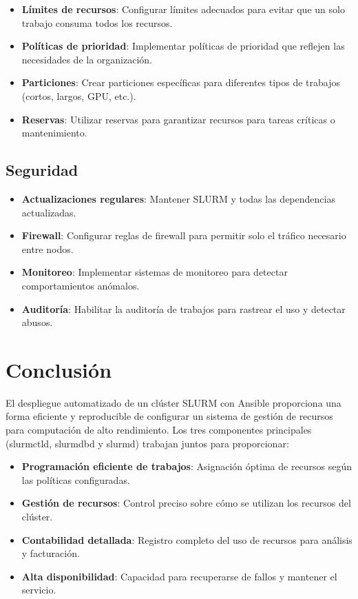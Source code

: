 \documentclass[12pt,a4paper]{article}
\begin{document}
\begin{itemize}[leftmargin=*]
    \item \textbf{Límites de recursos}: Configurar límites adecuados para evitar que un solo trabajo consuma todos los recursos.
    \item \textbf{Políticas de prioridad}: Implementar políticas de prioridad que reflejen las necesidades de la organización.
    \item \textbf{Particiones}: Crear particiones específicas para diferentes tipos de trabajos (cortos, largos, GPU, etc.).
    \item \textbf{Reservas}: Utilizar reservas para garantizar recursos para tareas críticas o mantenimiento.
\end{itemize}

\subsection{Seguridad}

\begin{itemize}[leftmargin=*]
    \item \textbf{Actualizaciones regulares}: Mantener SLURM y todas las dependencias actualizadas.
    \item \textbf{Firewall}: Configurar reglas de firewall para permitir solo el tráfico necesario entre nodos.
    \item \textbf{Monitoreo}: Implementar sistemas de monitoreo para detectar comportamientos anómalos.
    \item \textbf{Auditoría}: Habilitar la auditoría de trabajos para rastrear el uso y detectar abusos.
\end{itemize}

\section{Conclusión}

El despliegue automatizado de un clúster SLURM con Ansible proporciona una forma eficiente y reproducible de configurar un sistema de gestión de recursos para computación de alto rendimiento. Los tres componentes principales (slurmctld, slurmdbd y slurmd) trabajan juntos para proporcionar:

\begin{itemize}[leftmargin=*]
    \item \textbf{Programación eficiente de trabajos}: Asignación óptima de recursos según las políticas configuradas.
    \item \textbf{Gestión de recursos}: Control preciso sobre cómo se utilizan los recursos del clúster.
    \item \textbf{Contabilidad detallada}: Registro completo del uso de recursos para análisis y facturación.
    \item \textbf{Alta disponibilidad}: Capacidad para recuperarse de fallos y mantener el servicio.
\end{itemize}
\end{document}
